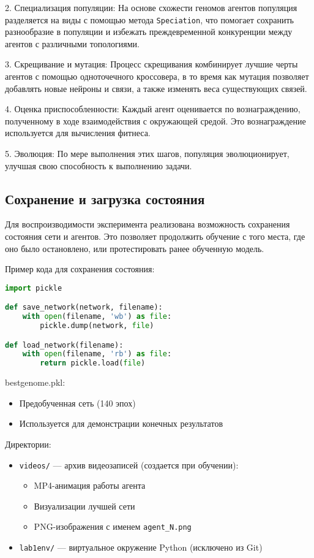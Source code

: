 \documentclass[a4paper,12pt]{article}
\begin{document}
2. Специализация популяции: На основе схожести геномов агентов популяция разделяется на виды с помощью метода \texttt{Speciation}, что помогает сохранить разнообразие в популяции и избежать преждевременной конкуренции между агентов с различными топологиями.

3. Скрещивание и мутация: Процесс скрещивания комбинирует лучшие черты агентов с помощью одноточечного кроссовера, в то время как мутация позволяет добавлять новые нейроны и связи, а также изменять веса существующих связей.

4. Оценка приспособленности: Каждый агент оценивается по вознаграждению, полученному в ходе взаимодействия с окружающей средой. Это вознаграждение используется для вычисления фитнеса.

5. Эволюция: По мере выполнения этих шагов, популяция эволюционирует, улучшая свою способность к выполнению задачи.

\subsection{Сохранение и загрузка состояния}

Для воспроизводимости эксперимента реализована возможность сохранения состояния сети и агентов. Это позволяет продолжить обучение с того места, где оно было остановлено, или протестировать ранее обученную модель.

Пример кода для сохранения состояния:

\begin{lstlisting}[language=Python]
import pickle

def save_network(network, filename):
    with open(filename, 'wb') as file:
        pickle.dump(network, file)

def load_network(filename):
    with open(filename, 'rb') as file:
        return pickle.load(file)
\end{lstlisting}	
	bestgenome.pkl:
	\begin{itemize}
		\item Предобученная сеть (140 эпох)
		\item Используется для демонстрации конечных результатов
	\end{itemize}
	
	Директории:
	\begin{itemize}
		\item \texttt{videos/} --- архив видеозаписей (создается при обучении):
		\begin{itemize}
			\item MP4-анимация работы агента

		\end{itemize}
		\begin{itemize}
			\item Визуализации лучшей сети
			\item PNG-изображения с именем \texttt{agent\_N.png}
		\end{itemize}
		\item \texttt{lab1env/} --- виртуальное окружение Python (исключено из Git)
	\end{itemize}
\end{document}
